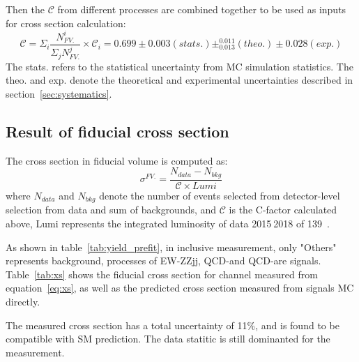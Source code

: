 Then the $\mathcal{C}$ from different processes are combined together to be used as inputs for cross section calculation:
\begin{equation}
	\mathcal{C} = \Sigma_{i} \frac{N_{FV.}^{i}}{\Sigma_{j} N_{FV.}^{j}} \times \mathcal{C}_{i} = 0.699\pm0.003(stats.)\pm^{0.011}_{0.013}(theo.)\pm0.028(exp.)
\end{equation}
The stats. refers to the statistical uncertainty from MC simulation statistics.
The theo. and exp. denote the theoretical and experimental uncertainties described in section~\ref{sec:systematics}.

\subsection{Result of fiducial cross section}

The cross section in fiducial volume is computed as:
\begin{equation}\label{eq:xs}
	\sigma^{FV.} = \frac{N_{data} - N_{bkg}}{\mathcal{C} \times Lumi}
\end{equation}
where $N_{data}$ and $N_{bkg}$ denote the number of events selected from detector-level selection from data and sum of backgrounds,
and $\mathcal{C}$ is the C-factor calculated above, Lumi represents the integrated luminosity of data 2015$~$2018 of 139~\ifb.

As shown in table~\ref{tab:yield_prefit}, in inclusive measurement, only "Others" represents background, 
processes of EW-ZZjj, QCD-\qqZZ and QCD-\ggZZ are signals.
Table~\ref{tab:xs} shows the fiducial cross section for \llll channel measured from equation~\ref{eq:xs}, 
as well as the predicted cross section measured from signals MC directly.
\begin{table}[!htbp]
\begin{center}
\end{center}
\caption{
Measured and predicted fiducial cross-sections in \lllljj final-state.
Uncertainties due to different sources are presented.
}
\label{tab:xs}
\end{table}
The measured cross section has a total uncertainty of 11\%, and is found to be compatible with SM prediction.
The data statitic is still dominanted for the measurement.
